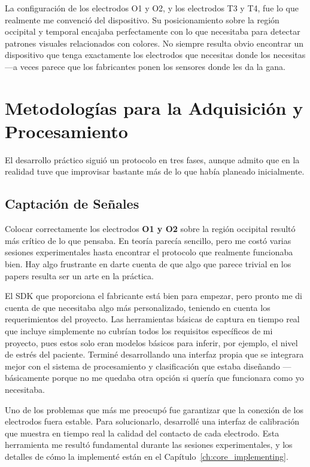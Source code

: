 La configuración de los electrodos O1 y O2, y los electrodos T3 y T4, fue lo que realmente me convenció del dispositivo. Su posicionamiento sobre la región occipital y temporal encajaba perfectamente con lo que necesitaba para detectar patrones visuales relacionados con colores. No siempre resulta obvio encontrar un dispositivo que tenga exactamente los electrodos que necesitas donde los necesitas —a veces parece que los fabricantes ponen los sensores donde les da la gana.

\section{Metodologías para la Adquisición y Procesamiento}
El desarrollo práctico siguió un protocolo en tres fases, aunque admito que en la realidad tuve que improvisar bastante más de lo que había planeado inicialmente.

    \subsection{Captación de Señales}
    Colocar correctamente los electrodos \textbf{O1 y O2} sobre la región occipital resultó más crítico de lo que pensaba. En teoría parecía sencillo, pero me costó varias sesiones experimentales hasta encontrar el protocolo que realmente funcionaba bien. Hay algo frustrante en darte cuenta de que algo que parece trivial en los papers resulta ser un arte en la práctica.
    
    El SDK que proporciona el fabricante está bien para empezar, pero pronto me di cuenta de que necesitaba algo más personalizado, teniendo en cuenta los requerimientos del proyecto. Las herramientas básicas de captura en tiempo real que incluye simplemente no cubrían todos los requisitos específicos de mi proyecto, pues estos solo eran modelos básicos para inferir, por ejemplo, el nivel de estrés del paciente. Terminé desarrollando una interfaz propia que se integrara mejor con el sistema de procesamiento y clasificación que estaba diseñando —básicamente porque no me quedaba otra opción si quería que funcionara como yo necesitaba.
    
    Uno de los problemas que más me preocupó fue garantizar que la conexión de los electrodos fuera estable. Para solucionarlo, desarrollé una interfaz de calibración que muestra en tiempo real la calidad del contacto de cada electrodo. Esta herramienta me resultó fundamental durante las sesiones experimentales, y los detalles de cómo la implementé están en el Capítulo~\ref{ch:core_implementing}.

